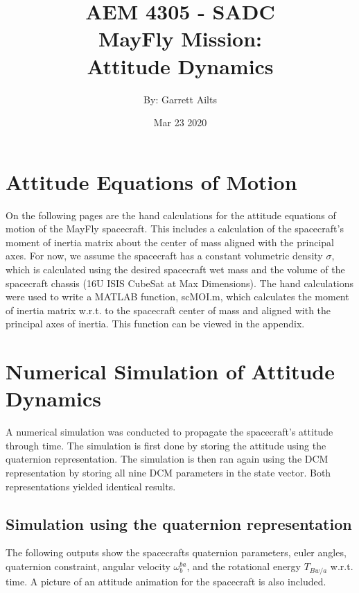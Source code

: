 \documentclass[12pt]{article}
\title{AEM 4305 - SADC \\ 
MayFly Mission: \\
Attitude Dynamics}
\author{By: Garrett Ailts}
\date{Mar 23 2020}
\begin{document}
\maketitle
\thispagestyle{empty}
\newpage

\section{Attitude Equations of Motion}
On the following pages are the hand calculations for the attitude equations of motion of the MayFly spacecraft. This includes a calculation of the spacecraft's moment of inertia matrix about the center of mass aligned with the principal axes. For now, we assume the spacecraft has a constant volumetric density \(\sigma\), which is calculated using the desired spacecraft wet mass and the volume of the spacecraft chassis (16U ISIS CubeSat at Max Dimensions). The hand calculations were used to write a MATLAB function, scMOI.m, which calculates the moment of inertia matrix w.r.t. to the spacecraft center of mass and aligned with the principal axes of inertia. This function can be viewed in the appendix.





\section{Numerical Simulation of Attitude Dynamics}
A numerical simulation was conducted to propagate the spacecraft's attitude through time. The simulation is first done by storing the attitude using the quaternion representation. The simulation is then ran again using the DCM representation by storing all nine DCM parameters in the state vector. Both representations yielded identical results. 

\subsection{Simulation using the quaternion representation} 
The following outputs show the spacecrafts quaternion parameters, euler angles, quaternion constraint, angular velocity $\omega^{ba}_{b}$, and the rotational energy $T_{Bw/a}$ w.r.t. time. A picture of an attitude animation for the spacecraft is also included.
\end{document}
